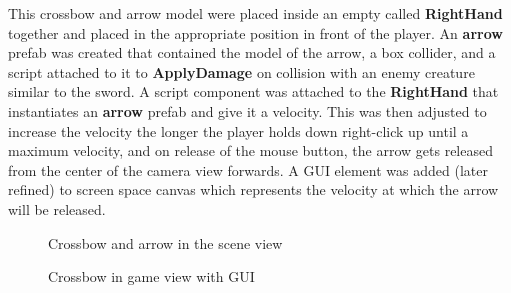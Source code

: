 \documentclass[11pt]{report}
\begin{document}
This crossbow and arrow model were placed inside an empty called \textbf{RightHand} together and placed in the appropriate position in front of the player. An \textbf{arrow} prefab was created that contained the model of the arrow, a box collider, and a script attached to it to \textbf{ApplyDamage} on collision with an enemy creature similar to the sword. A script component was attached to the \textbf{RightHand} that instantiates an \textbf{arrow} prefab and give it a velocity. This was then adjusted to increase the velocity the longer the player holds down right-click up until a maximum velocity, and on release of the mouse button, the arrow gets released from the center of the camera view forwards. A GUI element was added (later refined) to screen space canvas which represents the velocity at which the arrow will be released.
\begin{figure}[H]
    \begin{minipage}{.4\textwidth}
        \centering
        \caption{Crossbow and arrow in the scene view}
    \end{minipage}
    \begin{minipage}{.6\textwidth}
        \centering
        \caption{Crossbow in game view with GUI}
    \end{minipage}
\end{figure}
\end{document}
